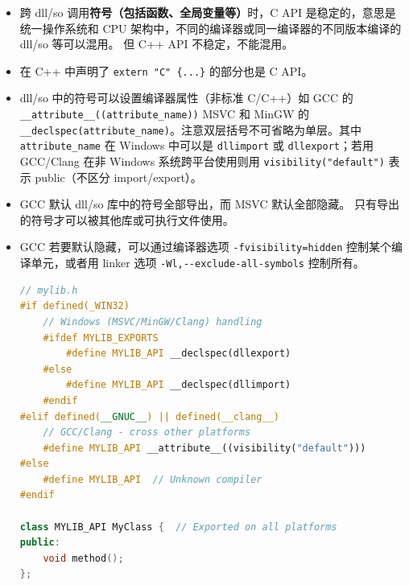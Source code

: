 

\begin{itemize}
\item 跨 dll/so 调用\textbf{符号（包括函数、全局变量等）}时，C API 是稳定的，意思是统一操作系统和 CPU 架构中，不同的编译器或同一编译器的不同版本编译的 dll/so 等可以混用。 但 C++ API 不稳定，不能混用。
\item 在 C++ 中声明了 \verb`extern "C" {...}` 的部分也是 C API。
\item dll/so 中的符号可以设置编译器属性（非标准 C/C++）如 GCC 的 \verb`__attribute__((attribute_name))` MSVC 和 MinGW 的 \verb`__declspec(attribute_name)`。注意双层括号不可省略为单层。其中 \verb`attribute_name` 在 Windows 中可以是 \verb`dllimport` 或 \verb`dllexport`；若用 GCC/Clang 在非 Windows 系统跨平台使用则用 \verb`visibility("default")` 表示 public（不区分 import/export）。
\item GCC 默认 dll/so 库中的符号全部导出，而 MSVC 默认全部隐藏。 只有导出的符号才可以被其他库或可执行文件使用。
\item GCC 若要默认隐藏，可以通过编译器选项 \verb`-fvisibility=hidden` 控制某个编译单元，或者用 linker 选项 \verb`-Wl,--exclude-all-symbols` 控制所有。
\begin{lstlisting}[language=cpp]
// mylib.h
#if defined(_WIN32)
    // Windows (MSVC/MinGW/Clang) handling
    #ifdef MYLIB_EXPORTS
        #define MYLIB_API __declspec(dllexport)
    #else
        #define MYLIB_API __declspec(dllimport)
    #endif
#elif defined(__GNUC__) || defined(__clang__)
    // GCC/Clang - cross other platforms
    #define MYLIB_API __attribute__((visibility("default")))
#else
    #define MYLIB_API  // Unknown compiler
#endif

class MYLIB_API MyClass {  // Exported on all platforms
public:
    void method();
};
\end{lstlisting}
\end{itemize}
